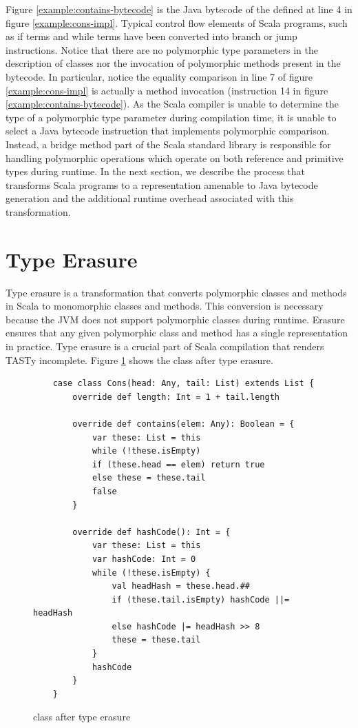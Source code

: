 Figure \ref{example:contains-bytecode} is the Java bytecode of the  defined at line 4 in figure \ref{example:cons-impl}.
Typical control flow elements of Scala programs, such as if terms and while terms have been converted into branch or jump instructions.
Notice that there are no polymorphic type parameters in the description of classes nor the invocation of polymorphic methods present in the bytecode.
In particular, notice the equality comparison in line 7 of figure \ref{example:cons-impl} is actually a method invocation (instruction 14 in figure \ref{example:contains-bytecode}).
As the Scala compiler is unable to determine the type of a polymorphic type parameter during compilation time, it is unable to select a Java bytecode instruction that implements polymorphic comparison.
Instead, a bridge method part of the Scala standard library is responsible for handling polymorphic operations which operate on both reference and primitive types during runtime.
In the next section, we describe the process that transforms Scala programs to a representation amenable to Java bytecode generation and the additional runtime overhead associated with this transformation.

\section{Type Erasure}
\label{background:type-erasure}

Type erasure\cite{java:generics} is a transformation that converts polymorphic classes and methods in Scala to monomorphic classes and methods. 
This conversion is necessary because the JVM does not support polymorphic classes during runtime.
Erasure ensures that any given polymorphic class and method has a single representation in practice.
Type erasure is a crucial part of Scala compilation that renders TASTy incomplete.
Figure \ref{example:erase-cons} shows the  class after type erasure.

\begin{figure}[!htb]
	\begin{verbatim}
	case class Cons(head: Any, tail: List) extends List {
		override def length: Int = 1 + tail.length
			
		override def contains(elem: Any): Boolean = {
			var these: List = this
			while (!these.isEmpty) 
			if (these.head == elem) return true
			else these = these.tail
			false
		}
			
		override def hashCode(): Int = {
			var these: List = this
			var hashCode: Int = 0
			while (!these.isEmpty) {
				val headHash = these.head.##
				if (these.tail.isEmpty) hashCode ||= headHash
				else hashCode |= headHash >> 8
				these = these.tail	
			}
			hashCode
		}
	}		
	\end{verbatim}
	\caption{ class after type erasure}
	\label{example:erase-cons}
\end{figure}

